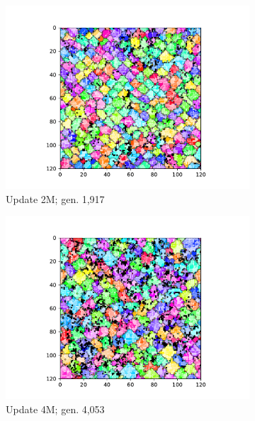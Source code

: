\begin{figure}
\begin{center}
\begin{subfigure}[b]{0.6\columnwidth}
  \includegraphics[width=\columnwidth,trim={2.5cm 0.5cm 2.5cm 1cm},clip]{img/ChannelMap_1011_update2000000}
  \caption{Update 2M; gen. 1,917}
  \label{fig:ChannelMap_1011_update2000000}
\end{subfigure}
\begin{subfigure}[b]{0.6\columnwidth}
  \includegraphics[width=\columnwidth,trim={2.5cm 0.5cm 2.5cm 1cm},clip]{img/ChannelMap_1011_update4000000}
  \caption{Update 4M; gen. 4,053}
  \label{fig:ChannelMap_1011_update4000000}
\end{subfigure}%
\begin{subfigure}[b]{0.6\columnwidth}

\end{subfigure}
\end{center}
\end{figure}

